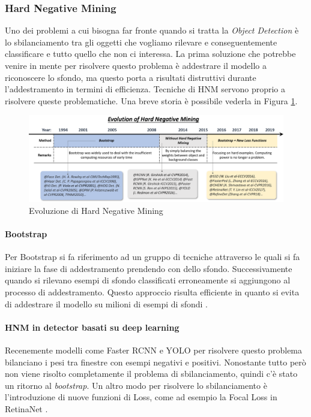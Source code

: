 \subsubsection{Hard Negative Mining}
Uno dei problemi a cui bisogna far fronte quando si tratta la \textit{Object Detection} è lo sbilanciamento tra gli oggetti che vogliamo rilevare e conseguentemente classificare e tutto quello che non ci interessa. La prima soluzione che potrebbe venire in mente per risolvere questo problema è addestrare il modello a riconoscere lo sfondo, ma questo porta a risultati distruttivi durante l'addestramento in termini di efficienza. Tecniche di \ac{HNM} servono proprio a risolvere queste problematiche. Una breve storia è possibile vederla in Figura \ref{fig:HNM_history}.
\begin{figure}
    \centering
    \includegraphics[width=\textwidth]{images/evol-hardnegmining.png}
    \caption{Evoluzione di Hard Negative Mining \cite{DBLP:journals/corr/abs-1905-05055}}
    \label{fig:HNM_history}
\end{figure}
\paragraph{Bootstrap}
Per Bootstrap si fa riferimento ad un gruppo di tecniche attraverso le quali si fa iniziare la fase di addestramento prendendo con dello sfondo. Successivamente quando si rilevano esempi di sfondo classificati erroneamente si aggiungono al processo di addestramento. Questo approccio risulta efficiente in quanto si evita di addestrare il modello su milioni di esempi di sfondi \cite{viola2001rapid, papageorgiou1998general, rowley1996human}.
\paragraph{HNM in detector basati su deep learning}
Recenemente modelli come Faster RCNN e \ac{YOLO} per risolvere questo problema bilanciano i pesi tra finestre con esempi negativi e positivi. Nonostante tutto però non viene risolto completamente il problema di sbilanciamento, quindi c'è stato un ritorno al \textit{bootstrap}. Un altro modo per risolvere lo sbilanciamento è l'introduzione di nuove funzioni di Loss, come ad esempio la Focal Loss in RetinaNet \cite{lin2017focal}. 
